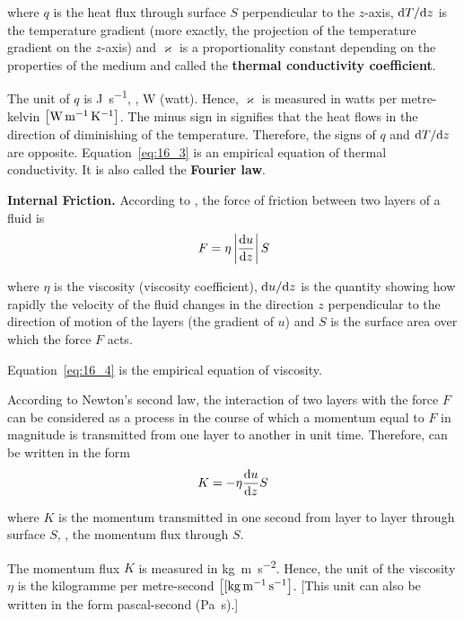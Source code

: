 \noindent
where $q$ is the heat flux through surface $S$ perpendicular to the $z$-axis, $\mathrm{d} T/\mathrm{d} z$ is the temperature gradient (more exactly, the projection of the temperature gradient on the $z$-axis) and $\varkappa$ is a proportionality constant depending on the properties of the medium and called the \textbf{thermal conductivity coefficient}.

The unit of $q$ is \si{\joule\per\second}, \ie, \si{\watt} (watt). Hence, $\varkappa$ is measured in watts per metre-kelvin $\left[\si{\watt\per\metre\per\kelvin}\right]$. The minus sign in  signifies
that the heat flows in the direction of diminishing of the temperature. Therefore, the signs of $q$ and $\mathrm{d} T/\mathrm{d} z$ are opposite. Equation~\eqref{eq:16_3} is an empirical equation of thermal conductivity. It is also called the \textbf{Fourier law}.

\textbf{Internal Friction.} According to , the force of friction between two layers of a fluid is
\begin{equation}\label{eq:16_4}
    F = \eta \left| \frac{\mathrm{d} u}{\mathrm{d} z} \right| S
\end{equation}

\noindent
where $\eta$ is the viscosity (viscosity coefficient), $\mathrm{d} u/\mathrm{d} z$ is the quantity showing how rapidly the velocity of the fluid changes in the direction $z$ perpendicular to the direction of motion of the layers (the gradient of $u$) and $S$ is the surface area over which the force $F$ acts.

Equation~\eqref{eq:16_4} is the empirical equation of viscosity.

According to Newton's second law, the interaction of two layers with the force $F$ can be considered as a process in the course of which a momentum equal to $F$ in magnitude is transmitted from one layer to another in unit time. Therefore,  can be written in the form
\begin{equation}\label{eq:16_5}
    K = -\eta \frac{\mathrm{d} u}{\mathrm{d} z} S
\end{equation}

\noindent
where $K$ is the momentum transmitted in one second from layer to layer through surface $S$, \ie, the momentum flux through $S$.

The momentum flux $K$ is measured in \si{\kilo\gram\metre\per\second\squared}. Hence, the unit of the viscosity $\eta$ is the kilogramme per metre-second $\left[[\si{\kilo\gram\per\metre\per\second}\right]$. [This unit can also be written in the form pascal-second (\si{\pascal\second}).]

